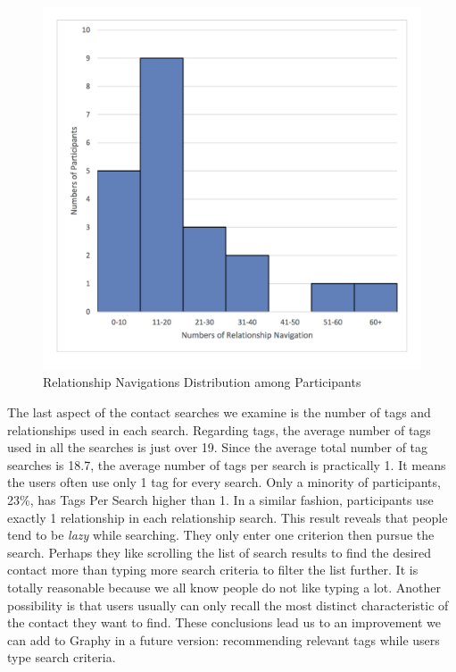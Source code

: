 \begin{figure}[!h]
\begin{centering}
\includegraphics[scale=0.68]{pics/relationship_navigation_histogram.png}
\caption{Relationship Navigations Distribution among Participants}\label{fig:relationship_navigation_histogram}
\end{centering}
\end{figure}

The last aspect of the contact searches we examine is the number of tags and relationships used in each search. Regarding tags, the average number of tags used in all the searches is just over 19. Since the average total number of tag searches is 18.7, the average number of tags per search is practically 1. It means the users often use only 1 tag for every search. Only a minority of participants, 23\%, has Tags Per Search higher than 1. In a similar fashion, participants use exactly 1 relationship in each relationship search. This result reveals that people tend to be \textit{lazy} while searching. They only enter one criterion then pursue the search. Perhaps they like scrolling the list of search results to find the desired contact more than typing more search criteria to filter the list further. It is totally reasonable because we all know people do not like typing a lot. Another possibility is that users usually can only recall the most distinct characteristic of the contact they want to find. These conclusions lead us to an improvement we can add to Graphy in a future version: recommending relevant tags while users type search criteria.

